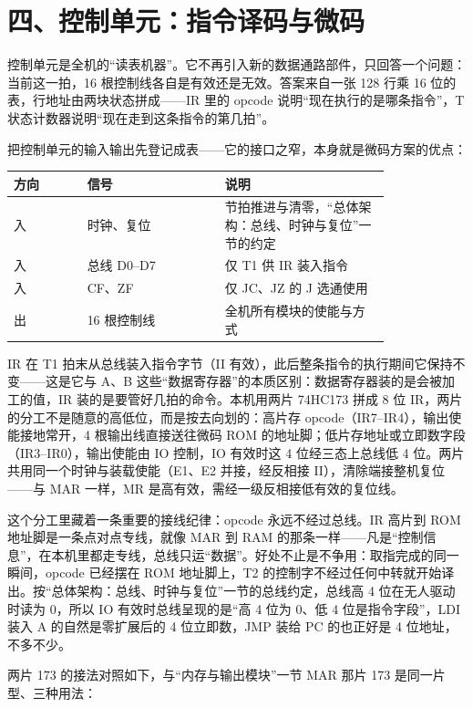 \section{四、控制单元：指令译码与微码}

控制单元是全机的“读表机器”。它不再引入新的数据通路部件，只回答一个问题：当前这一拍，16 根控制线各自是有效还是无效。答案来自一张 128 行乘 16 位的表，行地址由两块状态拼成——IR 里的 opcode 说明“现在执行的是哪条指令”，T 状态计数器说明“现在走到这条指令的第几拍”。

把控制单元的输入输出先登记成表——它的接口之窄，本身就是微码方案的优点：

\begin{longtable}{L{0.16\linewidth}L{0.30\linewidth}L{0.36\linewidth}}
\toprule
方向 & 信号 & 说明 \\
\midrule
入 & 时钟、复位 & 节拍推进与清零，“总体架构：总线、时钟与复位”一节的约定 \\\tablerowrule
入 & 总线 D0–D7 & 仅 T1 供 IR 装入指令 \\\tablerowrule
入 & CF、ZF & 仅 JC、JZ 的 J 选通使用 \\\tablerowrule
出 & 16 根控制线 & 全机所有模块的使能与方式 \\
\bottomrule
\end{longtable}

IR 在 T1 拍末从总线装入指令字节（II 有效），此后整条指令的执行期间它保持不变——这是它与 A、B 这些“数据寄存器”的本质区别：数据寄存器装的是会被加工的值，IR 装的是要管好几拍的命令。本机用两片 74HC173 拼成 8 位 IR，两片的分工不是随意的高低位，而是按去向划的：高片存 opcode（IR7–IR4），输出使能接地常开，4 根输出线直接送往微码 ROM 的地址脚；低片存地址或立即数字段（IR3–IR0），输出使能由 IO 控制，IO 有效时这 4 位经三态上总线低 4 位。两片共用同一个时钟与装载使能（E1、E2 并接，经反相接 II），清除端接整机复位——与 MAR 一样，MR 是高有效，需经一级反相接低有效的复位线。

这个分工里藏着一条重要的接线纪律：opcode 永远不经过总线。IR 高片到 ROM 地址脚是一条点对点专线，就像 MAR 到 RAM 的那条一样——凡是“控制信息”，在本机里都走专线，总线只运“数据”。好处不止是不争用：取指完成的同一瞬间，opcode 已经摆在 ROM 地址脚上，T2 的控制字不经过任何中转就开始译出。按“总体架构：总线、时钟与复位”一节的总线约定，总线高 4 位在无人驱动时读为 0，所以 IO 有效时总线呈现的是“高 4 位为 0、低 4 位是指令字段”，LDI 装入 A 的自然是零扩展后的 4 位立即数，JMP 装给 PC 的也正好是 4 位地址，不多不少。

两片 173 的接法对照如下，与“内存与输出模块”一节 MAR 那片 173 是同一片型、三种用法：

